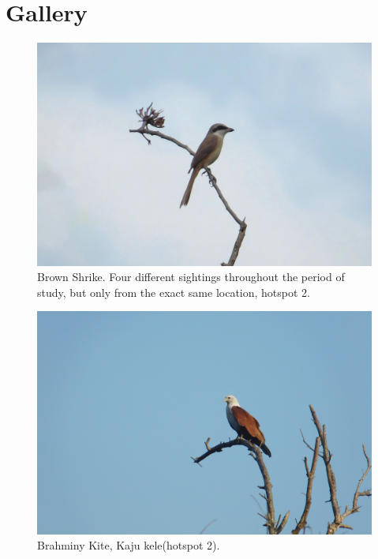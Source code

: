 \chapter{Gallery}
\label{cp:Gallery}
\begin{figure}[!htpb]
    \centering
    \includegraphics[width=\linewidth]{Figures/brown-shrike.JPG}
    \caption[]{Brown Shrike. Four different sightings throughout the period of study, but only from the exact same location, hotspot 2.}
    \label{fig:figure-01}
\end{figure}
\begin{figure}[!htpb]
    \centering
    \includegraphics[width=\linewidth]{Figures/brahmini-kite.JPG}
    \caption[]{Brahminy Kite, Kaju kele(hotspot 2).}
    \label{fig:figure-01}
\end{figure}
